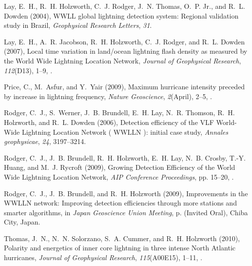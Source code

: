 \documentclass[draft,ras]{agutex}
\begin{document}
\begin{article}
\begin{thebibliography}{23}
Lay, E.~H., R.~H. Holzworth, C.~J. Rodger, J.~N. Thomas, O.~P. Jr., and R.~L.
  Dowden (2004), {WWLL global lightning detection system: Regional validation
  study in Brazil}, \textit{Geophysical Research Letters}, \textit{31}.

Lay, E.~H., A.~R. Jacobson, R.~H. Holzworth, C.~J. Rodger, and R.~L. Dowden
  (2007), {Local time variation in land/ocean lightning flash density as
  measured by the World Wide Lightning Location Network}, \textit{Journal of
  Geophysical Research}, \textit{112}(D13), 1--9, .

Price, C., M.~Asfur, and Y.~Yair (2009), {Maximum hurricane intensity preceded
  by increase in lightning frequency}, \textit{Nature Geoscience},
  \textit{2}(April), 2--5, .

Rodger, C.~J., S.~Werner, J.~B. Brundell, E.~H. Lay, N.~R. Thomson, R.~H.
  Holzworth, and R.~L. Dowden (2006), {Detection efficiency of the VLF
  World-Wide Lightning Location Network ( WWLLN ): initial case study},
  \textit{Annales geophysicae}, \textit{24}, 3197--3214.

Rodger, C.~J., J.~B. Brundell, R.~H. Holzworth, E.~H. Lay, N.~B. Crosby, T.-Y.
  Huang, and M.~J. Rycroft (2009{}), {Growing Detection Efficiency
  of the World Wide Lightning Location Network}, \textit{AIP Conference
  Proceedings}, pp. 15--20, .

Rodger, C.~J., J.~B. Brundell, and R.~H. Holzworth (2009{}),
  {Improvements in the WWLLN network: Improving detection efficiencies through
  more stations and smarter algorithms}, in \textit{Japan Geoscience Union
  Meeting}, p. (Invited Oral), Chiba City, Japan.

Thomas, J.~N., N.~N. Solorzano, S.~A. Cummer, and R.~H. Holzworth (2010),
  {Polarity and energetics of inner core lightning in three intense North
  Atlantic hurricanes}, \textit{Journal of Geophysical Research},
  \textit{115}(A00E15), 1--11, .


\end{thebibliography}
\end{article}
\end{document}
